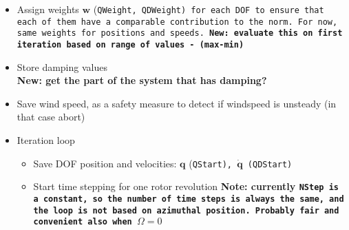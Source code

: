 \documentclass[11pt]{article}
\begin{document}
\begin{itemize}\tightlist
    \item Assign weights \(\boldsymbol{w}\) (\tt{QWeight},
        \tt{QDWeight}) for each DOF to ensure that each of them have a
        comparable contribution to the norm. For now, same weights for
        positions and speeds. \textbf{New: evaluate this on first iteration
        based on range of values - (max-min)}
    \item Store damping values\\
        \textbf{New: get the part of the system that has damping?}
    \item Save wind speed, as a safety measure to detect if windspeed is unsteady (in that case abort)
    \item Iteration loop
        \begin{itemize} \tightlist
            \item Save DOF position and velocities: \(\boldsymbol{q}\)
                (\tt{QStart}), \(\boldsymbol{\dot{q}}\) (\tt{QDStart})
            \item Start time stepping for one rotor revolution \textbf{Note: currently
                    \tt{NStep} is a constant, so the number of time steps is always
                    the same, and the loop is not based on azimuthal position. Probably
                fair and convenient also when \(\Omega=0\)}


\end{itemize}
\end{itemize}
\end{document}
